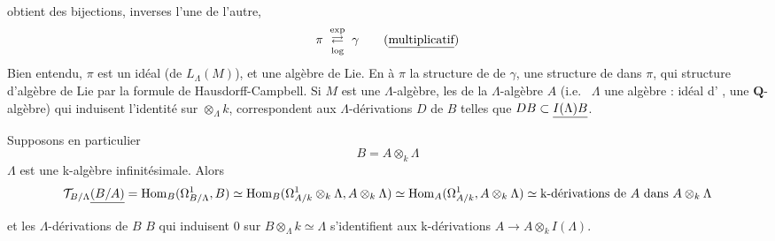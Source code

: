 \documentclass[11pt,a4paper]{article}
\begin{document}
\ill{} obtient des bijections, inverses l'une de l'autre,
\[
  \pi \;\underset{\log}{\overset{\exp}{\rightleftarrows}}\; \gamma
  \qquad (\uncertain{\text{multiplicatif}})
\]
Bien entendu, $\pi$ est un idéal (de $L_{\Lambda}(M)$), et
 une algèbre de Lie. En
 à $\pi$ la structure de  de
$\gamma$, \ill{}  une structure de 
dans $\pi$, qui \ill{} \ill{} \ill{}  \ill{} structure
d'algèbre de Lie par la formule de Hausdorff-Campbell. Si $M$ est une
$\Lambda$-algèbre, \ill{}  \ill{} 
les  de la $\Lambda$-algèbre $A$ (i.e.\ \ill{}
$\Lambda$ \ill{} une algèbre \ill{} \ill{} : \struck{\ill{}} idéal
d' \ill{} \ill{}, \ill{} \ill{} une
$\mathbf{Q}$-algèbre) qui induisent l'identité sur
\struck{\ill{}}$\otimes_{\Lambda} k$, correspondent
 aux $\Lambda$-dérivations $D$ de $B$ telles que
$D B \subset \uncertain{I(\Lambda) B}$.

Supposons en particulier
\[
  B = A \otimes_{k} \Lambda
\]
 $\Lambda$ est une k-algèbre infinitésimale. Alors
\struck{\ill{} $\Omega^{\prime}_{\Lambda}$}
\[
  \mathcal{T}_{B/\Lambda} \struck{(B/A)}
  = \operatorname{Hom}_{B}(\Omega^{1}_{B/\Lambda}, B)
  \simeq \operatorname{Hom}_{B}(\Omega^{1}_{A/k} \otimes_{k} \Lambda,
    A \otimes_{k} \Lambda)
  \simeq \operatorname{Hom}_{A}(\Omega^{1}_{A/k}, A \otimes_{k} \Lambda)
  \simeq \text{k-dérivations de } A \text{ dans } A \otimes_{k} \Lambda
\]
et les $\Lambda$-dérivations de $B$  $B$ qui induisent
$0$ sur $B \otimes_{\Lambda} k \simeq \Lambda$ s'identifient aux
k-dérivations $A \longrightarrow A \otimes_{k} I(\Lambda)$.
\end{document}
